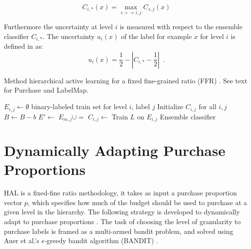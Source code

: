 \documentclass[ms]{nuthesis}
\begin{document}
\begin{equation}
\label{eq:maxcombine}
  C_{i,*}(x) = \max_{s>=i,j} C_{s,j}(x)
\end{equation}


Furthermore the uncertainty at level $i$
is measured with respect to the ensemble classifier $C_{i,*}$. The
uncertainty $u_i(x)$ of the label for example $x$ for level $i$ is defined
in as: %
\begin{equation}
\label{eq:uncert}
 u_i(x) = \frac{1}{2} - \left| C_{i,*} - \frac{1}{2} \right|
\enspace .
\end{equation}



\begin{algorithm}[!htb]
\small{
\caption{Method hierarchical active learning for a fixed
fine-grained ratio (FFR) \cite{yugi}.
See text for Purchase and LabelMap.
}
\label{alg:halalgo}
\begin{algorithmic}
\State  $E_{i,j} \gets \emptyset$  \Comment binary-labeled train set for
level $i$, label $j$
\State Initialize $C_{i,j}$ for all $i, j$
  \State $B \gets B-b$
    \State $E' \gets$ 
           \State $E_{m,j} \cup=$ 
       \EndFor
    \EndFor
  \EndFor
    \State $C_{i,j} \gets$ Train $L$ on $E_{i,j}$
  \EndFor
  \EndFor
\EndWhile
\State \Return Ensemble classifier
\EndFunction
\end{algorithmic}
}
\end{algorithm}

\section{Dynamically Adapting Purchase Proportions}
\label{sect:BANDIT}
HAL is a fixed-fine ratio methodology, it takes as input a purchase proportion
vector $p$, which specifies how much of the budget should be used to purchase at
a given level in the hierarchy. The following strategy is developed to
dynamically adapt to purchase proportions \cite{yugi}. The task of choosing the
level of granularity to purchase labels is framed as a multi-armed bandit problem,
and solved using Auer et al.'s $\epsilon$-greedy bandit algorithm (BANDIT) \cite{Auer2002}.
\end{document}
